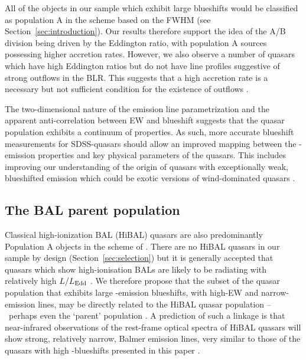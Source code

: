 All of the objects in our sample which exhibit large  blueshifts would be classified as population A in the \citet{sulentic00b} scheme based on the \ha FWHM (see Section~\ref{sec:introduction}). 
Our results therefore support the idea of the \citet{sulentic00b} A/B division being driven by the Eddington ratio, with population A sources possessing higher accretion rates.
However, we also observe a number of quasars which have high Eddington ratios but do not have line profiles suggestive of strong outflows in the  BLR.  
This suggests that a high accretion rate is a necessary but not sufficient condition for the existence of outflows \citep{baskin05}. 

The two-dimensional nature of the  emission line parametrization and the apparent anti-correlation between  EW and  blueshift suggests that the quasar population exhibits a continuum of properties. 
As such, more accurate  blueshift measurements for SDSS-quasars should allow an improved mapping between the -emission properties and key physical parameters of the quasars.
This includes improving our understanding of the origin of quasars with exceptionally weak, blueshifted  emission \citep[weak emission line quasars;][]{luo15} which could be exotic versions of wind-dominated quasars \citep{plotkin15}.

\subsection{The BAL parent population}

Classical high-ionization BAL (HiBAL) quasars are also predominantly Population A objects in the scheme of \citet{sulentic00b}. 
There are no HiBAL quasars in our sample by design (Section~\ref{sec:selection}) but it is generally accepted that quasars which show high-ionisation BALs are likely to be radiating with relatively high $L/L_{\rm Edd}$ \citep[e.g.][]{zhang14}. 
We therefore propose that the subset of the quasar population that exhibits large -emission blueshifts, with high-EW and narrow-\ha emission lines, may be directly related to the HiBAL quasar population \---\ perhaps even the `parent' population \citep{richards06conf}. 
A prediction of such a linkage is that near-infrared observations of the rest-frame optical spectra of HiBAL quasars will show strong, relatively narrow, Balmer emission lines, very similar to those of the quasars with high -blueshifts presented in this paper \citep[see][for such a study]{runnoe13b}. 

